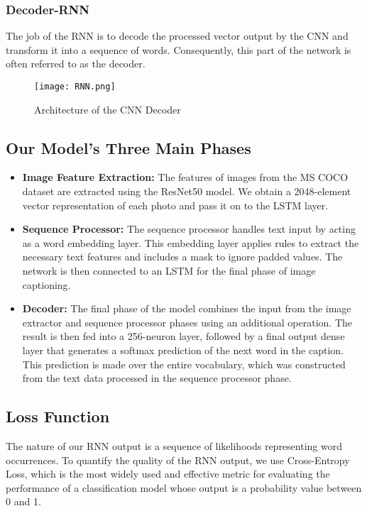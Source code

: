 \documentclass{article}
\begin{document}
\subsubsection{Decoder-RNN}

The job of the RNN is to decode the processed vector output by the CNN and transform it into a sequence of words. Consequently, this part of the network is often referred to as the decoder.

\begin{figure}[htp]
    \centering
    \texttt{[image: RNN.png]}
    \caption{Architecture of the CNN Decoder}
    \label{fig:cnn_decoder}
\end{figure}

\subsection{Our Model's Three Main Phases}

\begin{itemize}
    \item \textbf{Image Feature Extraction:} The features of images from the MS COCO dataset are extracted using the ResNet50 model. We obtain a 2048-element vector representation of each photo and pass it on to the LSTM layer.
    
    \item \textbf{Sequence Processor:} The sequence processor handles text input by acting as a word embedding layer. This embedding layer applies rules to extract the necessary text features and includes a mask to ignore padded values. The network is then connected to an LSTM for the final phase of image captioning.
    
    \item \textbf{Decoder:} The final phase of the model combines the input from the image extractor and sequence processor phases using an additional operation. The result is then fed into a 256-neuron layer, followed by a final output dense layer that generates a softmax prediction of the next word in the caption. This prediction is made over the entire vocabulary, which was constructed from the text data processed in the sequence processor phase.
\end{itemize}

\subsection{Loss Function}

The nature of our RNN output is a sequence of likelihoods representing word occurrences. To quantify the quality of the RNN output, we use Cross-Entropy Loss, which is the most widely used and effective metric for evaluating the performance of a classification model whose output is a probability value between 0 and 1.
\end{document}
